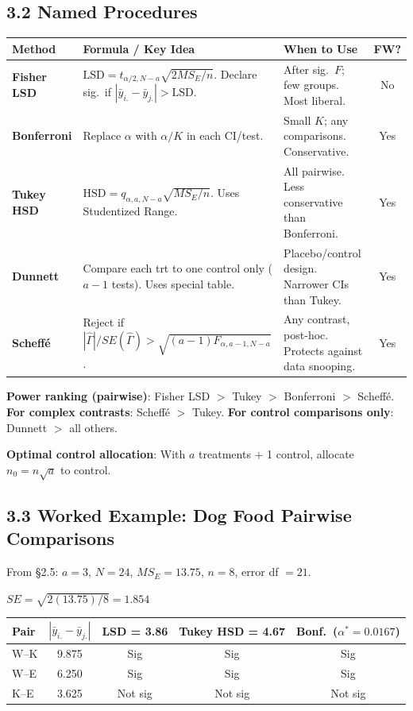 \documentclass[9pt,letterpaper]{article}
\begin{document}
\subsection{3.2 Named Procedures}

\begin{center}\small
\begin{tabular}{@{}p{1.6cm}p{4.8cm}p{3.8cm}c@{}}
\toprule
\textbf{Method} & \textbf{Formula / Key Idea} & \textbf{When to Use} & \textbf{FW?} \\
\midrule
\textbf{Fisher LSD} & $\text{LSD}=t_{\alpha/2,N-a}\sqrt{2 MS_E/n}$. Declare sig.\ if $|\bar{y}_{i.}-\bar{y}_{j.}|>\text{LSD}$. & After sig.\ $F$; few groups. Most liberal. & No \\[4pt]
\textbf{Bonferroni} & Replace $\alpha$ with $\alpha/K$ in each CI/test. & Small $K$; any comparisons. Conservative. & Yes \\[4pt]
\textbf{Tukey HSD} & $\text{HSD}=q_{\alpha,a,N-a}\sqrt{MS_E/n}$. Uses Studentized Range. & All pairwise. Less conservative than Bonferroni. & Yes \\[4pt]
\textbf{Dunnett} & Compare each trt to one control only ($a-1$ tests). Uses special table. & Placebo/control design. Narrower CIs than Tukey. & Yes \\[4pt]
\textbf{Scheff\'e} & Reject if $|\hat\Gamma|/SE(\hat\Gamma) > \sqrt{(a-1)F_{\alpha,a-1,N-a}}$. & Any contrast, post-hoc. Protects against data snooping. & Yes \\
\bottomrule
\end{tabular}
\end{center}

\textbf{Power ranking (pairwise)}: Fisher LSD $>$ Tukey $>$ Bonferroni $>$ Scheff\'e.\\
\textbf{For complex contrasts}: Scheff\'e $>$ Tukey. \quad \textbf{For control comparisons only}: Dunnett $>$ all others.

\textbf{Optimal control allocation}: With $a$ treatments + 1 control, allocate $n_0 = n\sqrt{a}$ to control.

\subsection{3.3 Worked Example: Dog Food Pairwise Comparisons}

From \S2.5: $a=3$, $N=24$, $MS_E=13.75$, $n=8$, error df $=21$.

$SE = \sqrt{2(13.75)/8} = 1.854$

\begin{center}\small
\begin{tabular}{@{}lcccc@{}}
\toprule
Pair & $|\bar{y}_{i.}-\bar{y}_{j.}|$ & LSD = 3.86 & Tukey HSD = 4.67 & Bonf.\ ($\alpha^*\!=\!0.0167$) \\
\midrule
W--K & 9.875 & Sig & Sig & Sig \\
W--E & 6.250 & Sig & Sig & Sig \\
K--E & 3.625 & Not sig & Not sig & Not sig \\
\bottomrule
\end{tabular}
\end{center}
\end{document}
